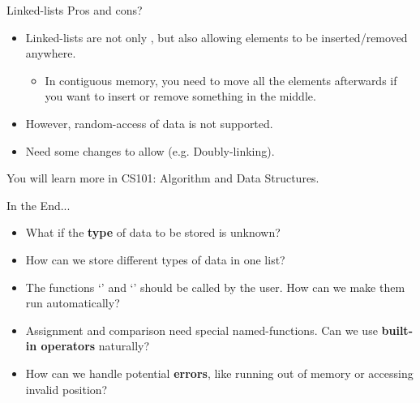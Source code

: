 \documentclass{beamer}
\begin{document}
\begin{frame}[fragile]{Linked-lists}
    Pros and cons?
    \pause
    \begin{itemize}
        \item Linked-lists are not only , but also allowing elements to be inserted/removed anywhere.
        \begin{itemize}
            \item In contiguous memory, you need to move all the elements afterwards if you want to insert or remove something in the middle.
        \end{itemize}
        \pause
        \item However, random-access of data is not supported.
        \pause
        \item Need some changes to allow  (e.g. Doubly-linking).
    \end{itemize}
    \pause
    You will learn more in CS101: Algorithm and Data Structures.
\end{frame}

\begin{frame}{In the End...}
    \begin{itemize}
        \item What if the \textbf{type} of data to be stored is unknown?
        \item How can we store different types of data in one list?
        \item The functions `' and `' should be called by the user. How can we make them run automatically?
        \item Assignment and comparison need special named-functions. Can we use \textbf{built-in operators} naturally?
        \item How can we handle potential \textbf{errors}, like running out of memory or accessing invalid position?
    \end{itemize}
    \pause
\end{frame}
\end{document}
